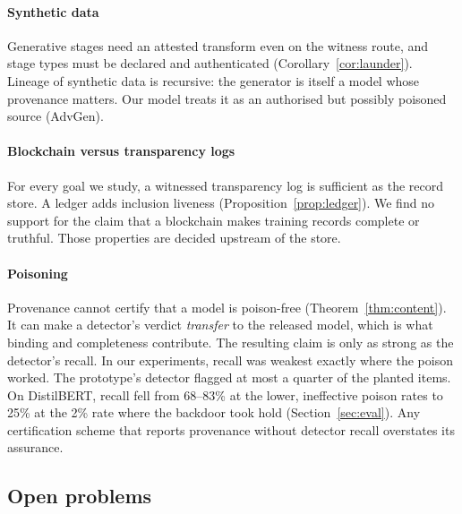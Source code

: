 \paragraph{Synthetic data}
Generative stages need an attested transform even on the witness route, and stage types
must be declared and authenticated (Corollary~\ref{cor:launder}). Lineage of synthetic data
is recursive: the generator is itself a model whose provenance matters. Our model treats it
as an authorised but possibly poisoned source (\textsf{AdvGen}).

\paragraph{Blockchain versus transparency logs}
For every goal we study, a witnessed transparency log is sufficient as the record store.
A ledger adds inclusion liveness (Proposition~\ref{prop:ledger}). We find no support for
the claim that a blockchain makes training records complete or truthful. Those properties
are decided upstream of the store.

\paragraph{Poisoning}
Provenance cannot certify that a model is poison-free (Theorem~\ref{thm:content}). It can
make a detector's verdict \emph{transfer} to the released model, which is what binding and
completeness contribute. The resulting claim is only as strong as the detector's recall.
In our experiments, recall was weakest exactly where the poison worked. The prototype's detector flagged at most a quarter of the planted items. On DistilBERT, recall fell from 68--83\% at the lower, ineffective poison rates to 25\% at the 2\% rate where the backdoor took hold (Section~\ref{sec:eval}). Any
certification scheme that reports provenance without detector recall overstates its
assurance.

\subsection{Open problems}

